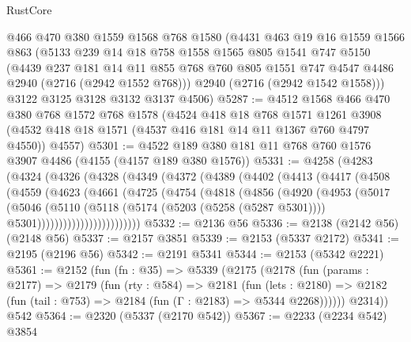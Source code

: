 \begin{lexlean}{RustCore}
\begin{coremodule}
    @466
    @470
    @380
    @1559
    @1568
    @768
    @1580
    (@4431
      @463
      @19
      @16
      @1559
      @1566
      @863
      (@5133
        @239
        @14
        @18
        @758
        @1558
        @1565
        @805
        @1541
        @747
        @5150
        (@4439
          @237
          @181
          @14
          @11
          @855
          @768
          @760
          @805
          @1551
          @747
          @4547
          @4486
          @2940
          (@2716 (@2942 @1552 @768)))
        @2940
        (@2716 (@2942 @1542 @1558)))
      @3122
      @3125
      @3128
      @3132
      @3137
      @4506)
@5287 := @4512
    @1568
    @466
    @470
    @380
    @768
    @1572
    @768
    @1578
    (@4524
      @418
      @18
      @768
      @1571
      @1261
      @3908
      (@4532 @418 @18 @1571 (@4537 @416 @181 @14 @11 @1367 @760 @4797 @4550))
      @4557)
@5301 := @4522 @189 @380 @181 @11 @768 @760 @1576 @3907 @4486 (@4155 (@4157 @189 @380 @1576))
@5331 := @4258
    (@4283
      (@4324
        (@4326
          (@4328
            (@4349
              (@4372
                (@4389
                  (@4402
                    (@4413
                      (@4417
                        (@4508
                          (@4559
                            (@4623
                              (@4661
                                (@4725
                                  (@4754
                                    (@4818
                                      (@4856
                                        (@4920
                                          (@4953
                                            (@5017
                                              (@5046
                                                (@5110
                                                  (@5118
                                                    (@5174 (@5203 (@5258 (@5287 @5301))))
                                                    @5301))))))))))))))))))))))))
@5332 := @2136 @56
@5336 := @2138 (@2142 @56) (@2148 @56)
@5337 := @2157 @3851
@5339 := @2153 (@5337 @2172)
@5341 := @2195 (@2196 @56)
@5342 := @2191 @5341
@5344 := @2153 (@5342 @2221)
@5361 := @2152
    (fun (fn : @35) =>
    @5339
      (@2175
        (@2178
          (fun (params : @2177) =>
          @2179
            (fun (rty : @584) =>
            @2181
              (fun (lets : @2180) =>
              @2182 (fun (tail : @753) => @2184 (fun (Γ : @2183) => @5344 @2268))))))
        @2314))
    @542
@5364 := @2320 (@5337 (@2170 @542))
@5367 := @2233 (@2234 @542) @3854

\end{coremodule}
\end{lexlean}
